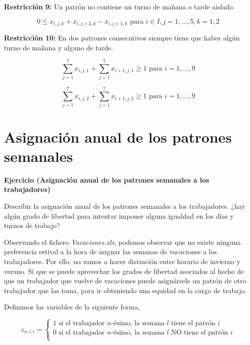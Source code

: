 \documentclass[a4paper,12pt]{article}
\newenvironment{exercise}[1]%
{%
  \par\vspace{\baselineskip}\noindent
  \textbf{Ejercicio (#1)}\begin{itshape}%
  \par\vspace{\baselineskip}\noindent\ignorespaces
}%
{%
  \end{itshape}\ignorespacesafterend
}
\begin{document}
\textbf{Restricci\'on 9:} Un patr\'on no contiene un turno de mañana o tarde aislado.

$$ 0 \leq x_{i,j,k} + x_{i,j+2,k} - x_{i,j+1,k} \text{ para } i\in I, j=1,\dots,5, k=1,2$$ 

\textbf{Restricci\'on 10:} En dos patrones consecutivos siempre tiene que haber alg\'un turno de mañana y alguno de tarde.

$$ \sum_{j=1}^{7} x_{i,j,1} + \sum_{j=1}^{7} x_{i+1,j,1} \geq 1 \text{ para } i=1,\dots,9$$

$$ \sum_{j=1}^{7} x_{i,j,2} + \sum_{j=1}^{7} x_{i+1,j,2} \geq 1 \text{ para } i=1,\dots,9$$



\section{Asignaci\'on anual de los patrones semanales}
\begin{exercise}{Asignaci\'on anual de los patrones semanales a los trabajadores}

Describir la asignaci\'on anual de los patrones semanales a los trabajadores. ¿hay alg\'un grado de libertad para intentar imponer alguna igualdad en los d\'ias y turnos de trabajo?\\

\end{exercise}

Observando el fichero \textit{Vacaciones.xls}, podemos observar que no existe ninguna preferencia estival a la hora de asignar las semanas de vacaciones a los trabajadores. Por ello, no vamos a hacer distinci\'on entre horario de invierno y verano. S\'i que se puede aprovechar los grados de libertad asociados al hecho de que un trabajador que vuelve de vacaciones puede asign\'arsele un patr\'on de otro trabajador que las toma, para ir obteniendo una equidad en la carga de trabajo. 

Definimos las variables de la siguiente forma,
	
	\begin{equation*}
	z_{n,l,i} = \left\lbrace \begin{array}{l}
		1 \text{ si el trabajador } n\text{-\'esimo, la semana } l \text{ tiene el patr\'on } i \\
     	0 \text{ si el trabajador } n\text{-\'esimo, la semana } l \text{ NO tiene el patr\'on } i \\

	\end{array}
	\right. 
	\end{equation*}
	
\end{document}
